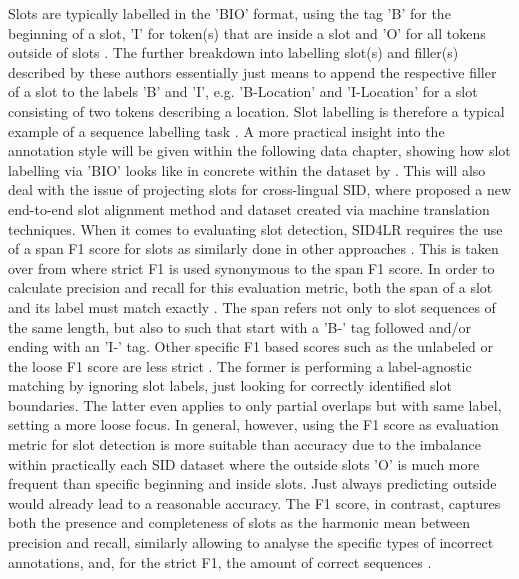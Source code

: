 \documentclass[11pt,a4paper,twoside,openright]{scrbook}
\begin{document}
Slots are typically labelled in the 'BIO' format, using the tag 'B' for the beginning of a slot, 'I' for token(s) that are inside a slot and 'O' for all tokens outside of slots \citep{jurafsky_martin_processing, larson2022survey}. The further breakdown into labelling slot(s) and filler(s) described by these authors essentially just means to append the respective filler of a  slot to the labels 'B' and 'I', e.g. 'B-Location' and 'I-Location' for a slot consisting of two tokens describing a location. Slot labelling is therefore a typical example of a sequence labelling task \citep{bunk2020understanding, van-der-goot-etal-2021-masked}. A more practical insight into the annotation style will be given within the following data chapter, showing how slot labelling via 'BIO' looks like in concrete within the dataset by \citet{van-der-goot-etal-2021-masked}. This will also deal with the issue of projecting slots for cross-lingual SID, where \citep{xu-etal-2020-end} proposed a new end-to-end slot alignment method and dataset created via machine translation techniques. 
When it comes to evaluating slot detection, SID4LR requires the use of a span F1 score for slots \citep{2023-findings-vardial} as similarly done in other approaches \citep{xu-etal-2020-end}. This is taken over from \citet{van-der-goot-etal-2021-masked} where strict F1 is used synonymous to the span F1 score. In order to calculate precision and recall for this evaluation metric, both the span of a slot and its label must match exactly \citep{van-der-goot-etal-2021-masked}. The span refers not only to slot sequences of the same length, but also to such that start with a 'B-' tag followed and/or ending with an 'I-' tag. Other specific F1 based scores such as the unlabeled or the loose F1 score are less strict \citep{van-der-goot-etal-2021-masked}. The former is performing a label-agnostic matching by ignoring slot labels, just looking for correctly identified slot boundaries. The latter even applies to only partial overlaps but with same label, setting a more loose focus. In general, however, using the F1 score as evaluation metric for slot detection is more suitable than accuracy due to the imbalance within practically each SID dataset where the outside slots 'O' is much more frequent than specific beginning and inside slots. Just always predicting outside would already lead to a reasonable accuracy. The F1 score, in contrast, captures both the presence and completeness of slots as the harmonic mean between precision and recall, similarly allowing to analyse the specific types of incorrect annotations, and, for the strict F1, the amount of correct sequences \citep{van-der-goot-etal-2021-masked}. %
\end{document}
